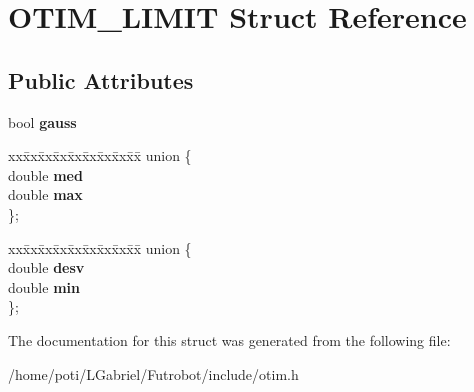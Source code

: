 \hypertarget{structOTIM__LIMIT}{}\section{O\+T\+I\+M\+\_\+\+L\+I\+M\+IT Struct Reference}
\label{structOTIM__LIMIT}
\subsection*{Public Attributes}
\begin{DoxyCompactItemize}
\item 
bool {\bfseries gauss}\hypertarget{structOTIM__LIMIT_a2c335ee23449699ec2e55a9f075ed683}{}\label{structOTIM__LIMIT_a2c335ee23449699ec2e55a9f075ed683}

\item 
\begin{tabbing}
xx\=xx\=xx\=xx\=xx\=xx\=xx\=xx\=xx\=\kill
union \{\\
\>double {\bfseries med}\\
\>double {\bfseries max}\\
\}; \hypertarget{structOTIM__LIMIT_a0856c45e38354dbd5d4015945ed3221a}{}\label{structOTIM__LIMIT_a0856c45e38354dbd5d4015945ed3221a}
\\

\end{tabbing}\item 
\begin{tabbing}
xx\=xx\=xx\=xx\=xx\=xx\=xx\=xx\=xx\=\kill
union \{\\
\>double {\bfseries desv}\\
\>double {\bfseries min}\\
\}; \hypertarget{structOTIM__LIMIT_a4d9d6628f5734081f82797c70a9125f0}{}\label{structOTIM__LIMIT_a4d9d6628f5734081f82797c70a9125f0}
\\

\end{tabbing}\end{DoxyCompactItemize}


The documentation for this struct was generated from the following file\+:\begin{DoxyCompactItemize}
\item 
/home/poti/\+L\+Gabriel/\+Futrobot/include/otim.\+h\end{DoxyCompactItemize}
